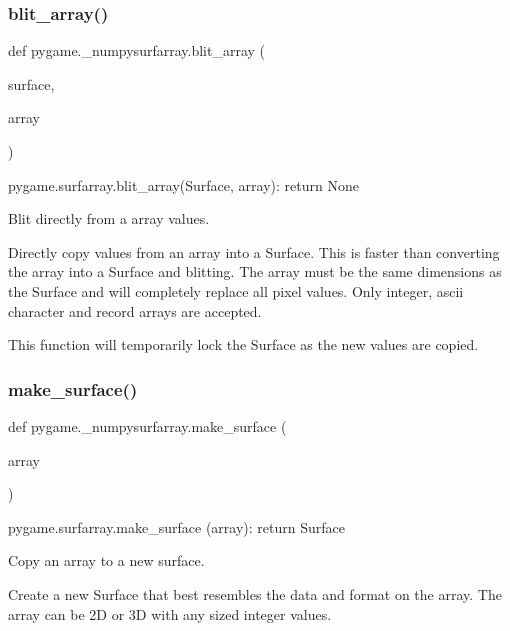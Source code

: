 \subsubsection{\texorpdfstring{blit\+\_\+array()}{blit\_array()}}
{\footnotesize\ttfamily def pygame.\+\_\+numpysurfarray.\+blit\+\_\+array (\begin{DoxyParamCaption}\item[{}]{surface,  }\item[{}]{array }\end{DoxyParamCaption})}

\begin{DoxyVerb}pygame.surfarray.blit_array(Surface, array): return None

Blit directly from a array values.

Directly copy values from an array into a Surface. This is faster than
converting the array into a Surface and blitting. The array must be the
same dimensions as the Surface and will completely replace all pixel
values. Only integer, ascii character and record arrays are accepted.

This function will temporarily lock the Surface as the new values are
copied.
\end{DoxyVerb}
 \mbox{\label{namespacepygame_1_1__numpysurfarray_ade6efe65656cde78cfaff828f386e34c}} 
\subsubsection{\texorpdfstring{make\+\_\+surface()}{make\_surface()}}
{\footnotesize\ttfamily def pygame.\+\_\+numpysurfarray.\+make\+\_\+surface (\begin{DoxyParamCaption}\item[{}]{array }\end{DoxyParamCaption})}

\begin{DoxyVerb}pygame.surfarray.make_surface (array): return Surface

Copy an array to a new surface.

Create a new Surface that best resembles the data and format on the
array. The array can be 2D or 3D with any sized integer values.
\end{DoxyVerb}
 \mbox{\label{namespacepygame_1_1__numpysurfarray_a04214dc9ffbf04b4192222c745873ec5}} 
